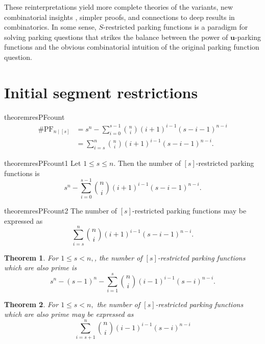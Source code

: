 \documentclass[12 pt]{amsart}
\newtheorem{theorem}{Theorem}[section]
\theoremstyle{definition} %
\theoremstyle{remark} %
\begin{document}
These reinterpretations yield more complete theories of the variants, new combinatorial insights , simpler proofs, and connections to deep results in combinatorics. In some sense, $S$-restricted parking functions is a paradigm for solving parking questions that strikes the balance between the power of $\mathbf{u}$-parking functions and the obvious combinatorial intuition of the original parking function question.

\section{Initial segment restrictions}

\begin{restatable}{theorem}{resPFcount}
	\label{thm:resPFcount}
	\[
		\begin{split}
			\# \mathrm{PF}_{n \mid [s]} & = s^{n} - \sum_{i = 0}^{s - 1} \binom{n}{i} (i + 1)^{i - 1} (s - i - 1)^{n - i} \\
				    & = \sum_{i = s}^{n} \binom{n}{i} (i + 1)^{i - 1} (s - i - 1)^{n - i}.
		\end{split}
	\]
\end{restatable}

\begin{restatable}{theorem}{resPFcount1}
    \label{thm:resPFcount1}
    Let $1\le s\le n.$ Then the number of $[s]$-restricted parking functions is
    \[s^{n} - \sum_{i = 0}^{s - 1} \binom{n}{i} (i + 1)^{i - 1} (s - i - 1)^{n - i}.\]
\end{restatable}

\begin{restatable}{theorem}{resPFcount2}
    \label{thm:resPFcount2}
    The number of $[s]$-restricted parking functions may be expressed as
    \[\sum_{i = s}^{n} \binom{n}{i} (i + 1)^{i - 1} (s - i - 1)^{n - i}.\]
\end{restatable}

\begin{theorem}
    \label{thm:resPPFcount1}
    For $1 \le s < n,$, the number of $[s]$-restricted parking functions which are also prime is 
    \[s^{n} - (s - 1)^{n} - \sum_{i = 1}^{s} \binom{n}{i} (i - 1)^{i - 1} (s - i)^{n - i}.\]
\end{theorem}

\begin{theorem}
    \label{thm:resPPFcount2}
    For $1 \le s < n,$ the number of $[s]$-restricted parking functions which are also prime may be expressed as
    \[\sum_{i = s + 1}^{n} \binom{n}{i} (i - 1)^{i - 1} (s - i)^{n - i}\]
\end{theorem}
\end{document}
